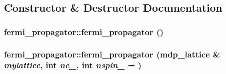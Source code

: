 \subsection{Constructor \& Destructor Documentation}
\hypertarget{classfermi__propagator_a55bbd357d5ffd3b57f835dab4a06d261}{
\subsubsection[{fermi\_\-propagator}]{\setlength{\rightskip}{0pt plus 5cm}fermi\_\-propagator::fermi\_\-propagator ()}}
\label{classfermi__propagator_a55bbd357d5ffd3b57f835dab4a06d261}
\hypertarget{classfermi__propagator_a41b0242793ca3da9ec2e67cdc05a9149}{
\subsubsection[{fermi\_\-propagator}]{\setlength{\rightskip}{0pt plus 5cm}fermi\_\-propagator::fermi\_\-propagator ({\bf mdp\_\-lattice} \& {\em mylattice}, \/  int {\em nc\_\-}, \/  int {\em nspin\_\-} = {})}}
\label{classfermi__propagator_a41b0242793ca3da9ec2e67cdc05a9149}


